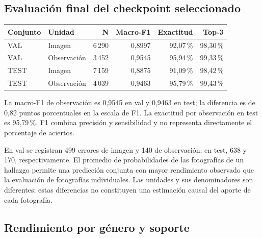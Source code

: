 \documentclass[11pt,a4paper]{article}
\begin{document}
\subsection{Evaluación final del checkpoint seleccionado}

\begin{center}\small\begin{tabular}{llrrrr}
\toprule
\textbf{Conjunto} & \textbf{Unidad} & \textbf{N} & \textbf{Macro-F1} & \textbf{Exactitud} & \textbf{Top-3}\\
\midrule
VAL & Imagen & 6\,290 & 0,8997 & 92,07\,\% & 98,30\,\%\\
VAL & Observación & 3\,452 & 0,9545 & 95,94\,\% & 99,33\,\%\\
TEST & Imagen & 7\,159 & 0,8875 & 91,09\,\% & 98,42\,\%\\
TEST & Observación & 4\,039 & 0,9463 & 95,79\,\% & 99,43\,\%\\
\bottomrule\end{tabular}\end{center}

La macro-F1 de observación es 0,9545 en val y 0,9463 en test; la
diferencia es de 0,82 puntos porcentuales en la escala de F1. La exactitud
por observación en test es 95,79\,\%. F1 combina precisión y sensibilidad
y no representa directamente el porcentaje de aciertos.

En val se registran 499 errores de imagen y 140 de observación; en test,
638 y 170, respectivamente. El promedio de probabilidades de las fotografías
de un hallazgo permite una predicción conjunta con mayor rendimiento
observado que la evaluación de fotografías individuales. Las unidades y
sus denominadores son diferentes; estas diferencias no constituyen una
estimación causal del aporte de cada fotografía.

\subsection{Rendimiento por género y soporte}
\end{document}
